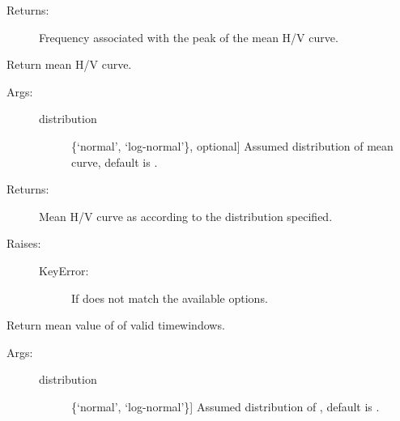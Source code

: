 \documentclass[letterpaper,10pt,english,openany,oneside]{sphinxmanual}
\begin{document}
\begin{fulllineitems}
\begin{fulllineitems}
\begin{description}
\begin{description}
\end{description}

\item[{Returns:}] \leavevmode
Frequency associated with the peak of the mean H/V curve.

\end{description}

\end{fulllineitems}


\begin{fulllineitems}
\label{\detokenize{index:hvsrpy.Hvsr.mean_curve}}
Return mean H/V curve.
\begin{description}
\item[{Args:}] \leavevmode\begin{description}
\item[{distribution}] \leavevmode{[}\{‘normal’, ‘log-normal’\}, optional{]}
Assumed distribution of mean curve, default is 
.

\end{description}

\item[{Returns:}] \leavevmode
Mean H/V curve as  according to the distribution
specified.

\item[{Raises:}] \leavevmode\begin{description}
\item[{KeyError:}] \leavevmode
If  does not match the available options.

\end{description}

\end{description}

\end{fulllineitems}


\begin{fulllineitems}
\label{\detokenize{index:hvsrpy.Hvsr.mean_f0}}
Return mean value of  of valid timewindows.
\begin{description}
\item[{Args:}] \leavevmode\begin{description}
\item[{distribution}] \leavevmode{[}\{‘normal’, ‘log-normal’\}{]}
Assumed distribution of , default is .


\end{description}
\end{description}
\end{fulllineitems}
\end{fulllineitems}
\end{document}
